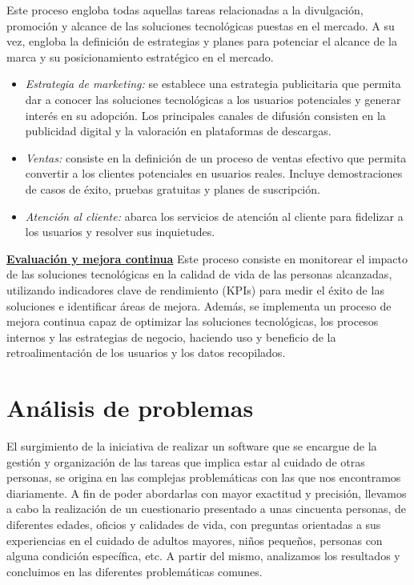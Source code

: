 \documentclass[a4paper,12pt]{article}
\begin{document}
    \newline
    Este proceso engloba todas aquellas tareas relacionadas a la divulgación, promoción y alcance de las soluciones tecnológicas puestas en el mercado. A su vez, engloba la definición de estrategias y planes para potenciar el alcance de la marca y su posicionamiento estratégico en el mercado.
    \begin{itemize}
        \item[] \textit{Estrategia de marketing:} se establece una estrategia publicitaria que permita dar a conocer las soluciones tecnológicas a los usuarios potenciales y generar interés en su adopción. Los principales canales de difusión consisten en la publicidad digital y la valoración en plataformas de descargas.
        \item[] \textit{Ventas:} consiste en la definición de un proceso de ventas efectivo que permita convertir a los clientes potenciales en usuarios reales. Incluye demostraciones de casos de éxito, pruebas gratuitas y planes de suscripción.
        \item[] \textit{Atención al cliente:} abarca los servicios de atención al cliente para fidelizar a los usuarios y resolver sus inquietudes.
    \end{itemize}
    \textbf{\underline{Evaluación y mejora continua}}
    \newline
    Este proceso consiste en monitorear el impacto de las soluciones tecnológicas en la calidad de vida de las personas alcanzadas, utilizando indicadores clave de rendimiento (KPIs) para medir el éxito de las soluciones e identificar áreas de mejora.\newline
    Además, se implementa un proceso de mejora continua capaz de optimizar las soluciones tecnológicas, los procesos internos y las estrategias de negocio, haciendo uso y beneficio de la retroalimentación de los usuarios y los datos recopilados.

    \section{Análisis de problemas}
    El surgimiento de la iniciativa de realizar un software que se encargue de la gestión y organización de las tareas que implica estar al cuidado de otras personas, se origina en las complejas problemáticas con las que nos encontramos diariamente.\newline
    A fin de poder abordarlas con mayor exactitud y precisión, llevamos a cabo la realización de un cuestionario presentado a unas cincuenta personas, de diferentes edades, oficios y calidades de vida, con preguntas orientadas a sus experiencias en el cuidado de adultos mayores, niños pequeños, personas con alguna condición específica, etc. A partir del mismo, analizamos los resultados y concluimos en las diferentes problemáticas comunes.\newline
    \newline
\end{document}
